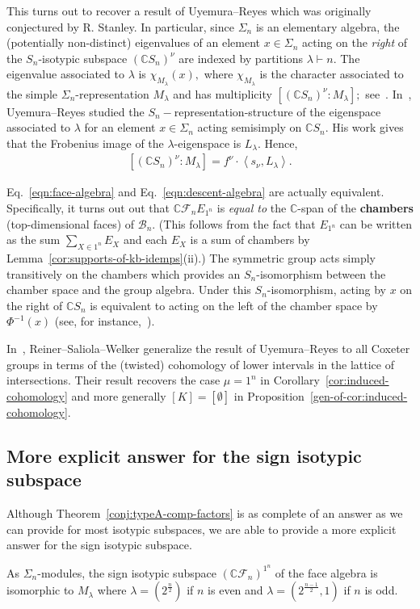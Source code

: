 \documentclass[ALCO, Unicode]{cedram}
\def\C{{\mathbb{C}}}
\begin{document}
    This turns out to recover a result of Uyemura--Reyes which was originally conjectured by R. Stanley. In particular, since $\Sigma_n$ is an elementary algebra, the (potentially non-distinct) {eigenvalues} of an element $x \in \Sigma_n$ acting on the \textit{right} of the $S_n$-isotypic subspace $\left(\C S_n\right)^\nu$ {are} indexed by partitions $\lambda \vdash n.$ The eigenvalue associated to $\lambda$ is $\chi_{M_\lambda}(x),$ where $\chi_{M_\lambda}$ is the character associated to the simple $\Sigma_n$-representation $M_\lambda$ and has multiplicity $[\left(\C S_n\right)^\nu: M_\lambda];$ see~\cite[Theorem D.38]{Aguiar-Mahajan}. In~\cite[Theorem 4.1]{Uyemura-Reyes}, Uyemura--Reyes studied the $S_n-$representation-structure of the eigenspace associated to $\lambda$ for an element $x \in \Sigma_n$ acting semisimply on $\C S_n$. His work gives that the Frobenius image of the $\lambda$-eigenspace is $L_\lambda.$ Hence,
     \begin{align}\label{eqn:descent-algebra}[\left(\C S_n\right)^\nu: M_\lambda] = f^\nu \cdot \left \langle s_\nu, L_\lambda \right \rangle.\end{align}
    
    Eq.~\eqref{eqn:face-algebra} and Eq.~\eqref{eqn:descent-algebra} are actually equivalent. Specifically, it turns out out that $\C \mathcal{F}_n E_{1^n}$ is \textit{equal to} the $\C$-span of the \textbf{chambers} (top-dimensional faces) of $\mathcal{B}_n.$ (This follows from the fact that $E_{1^n}$ can be written as the sum $\sum_{X \in 1^n}E_X$ and each $E_X$ is a sum of chambers by Lemma~\ref{cor:supports-of-kb-idemps}(ii).) The symmetric group acts simply transitively on the chambers which provides an $S_n$-isomorphism between the chamber space and the group algebra. Under this $S_n$-isomorphism, acting by $x$ on the right of $\C S_n$ is equivalent to acting on the left of the chamber space by $\Phi^{-1}(x)$ (see, for instance,~\cite[Theorem 8]{BrownonLRBs}).

In~\cite[Theorem 4.2]{reiner2014spectra}, Reiner--Saliola--Welker generalize the result of Uyemura--Reyes to all Coxeter groups in terms of the (twisted) cohomology of lower intervals in the lattice of intersections. Their result recovers the case $\mu = 1^n$ in Corollary~\ref{cor:induced-cohomology} and more generally $[K] = [\emptyset]$ in Proposition~\ref{gen-of-cor:induced-cohomology}. 

\subsection{More explicit answer for the sign isotypic subspace}
Although Theorem~\ref{conj:typeA-comp-factors} is as complete of an answer as we can provide for most isotypic subspaces, we are able to provide a more explicit answer for the sign isotypic subspace.
\begin{prop}\label{prop:sign-iso}
As $\Sigma_n$-modules, the sign isotypic subspace $\left(\C \mathcal{F}_n\right)^{1^n}$ of the face algebra is isomorphic to $M_\lambda$ where $\lambda = \left(2^{\frac{n}{2}}\right)$ if $n$ is even and $\lambda = \left(2^{\frac{n - 1}{2}}, 1\right)$ if $n$ is odd.
\end{prop}
\end{document}
